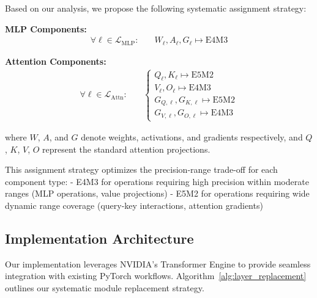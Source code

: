 \documentclass[conference]{IEEEtran}
\begin{document}
Based on our analysis, we propose the following systematic assignment strategy:

\textbf{MLP Components:}
\begin{align}
\forall \ell \in \mathcal{L}_{\mathrm{MLP}}: \quad &W_{\ell}, A_{\ell}, G_{\ell} \mapsto \text{E4M3} \label{eq:mlp_assignment}
\end{align}

\textbf{Attention Components:}
\begin{align}
\forall \ell \in \mathcal{L}_{\mathrm{Attn}}: \quad &\begin{cases}
Q_{\ell}, K_{\ell} \mapsto \text{E5M2} \\
V_{\ell}, O_{\ell} \mapsto \text{E4M3} \\
G_{Q,\ell}, G_{K,\ell} \mapsto \text{E5M2} \\
G_{V,\ell}, G_{O,\ell} \mapsto \text{E4M3}
\end{cases} \label{eq:attn_assignment}
\end{align}

where $W$, $A$, and $G$ denote weights, activations, and gradients respectively, and $Q$, $K$, $V$, $O$ represent the standard attention projections.

This assignment strategy optimizes the precision-range trade-off for each component type:
- E4M3 for operations requiring high precision within moderate ranges (MLP operations, value projections)
- E5M2 for operations requiring wide dynamic range coverage (query-key interactions, attention gradients)

\subsection{Implementation Architecture}

Our implementation leverages NVIDIA's Transformer Engine to provide seamless integration with existing PyTorch workflows. Algorithm~\ref{alg:layer_replacement} outlines our systematic module replacement strategy.
\end{document}
